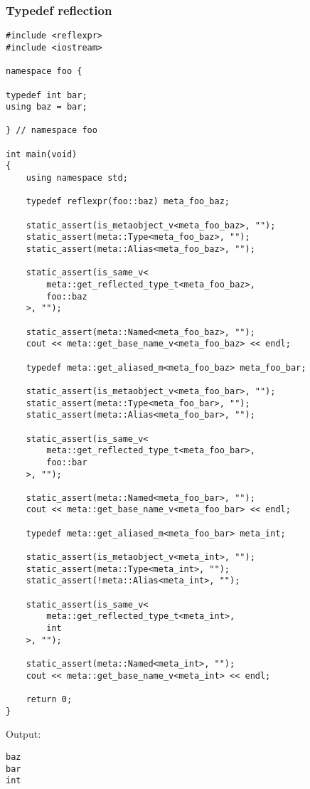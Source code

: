 \subsubsection{Typedef reflection}

\begin{verbatim}
#include <reflexpr>
#include <iostream>

namespace foo {

typedef int bar;
using baz = bar;

} // namespace foo

int main(void)
{
	using namespace std;

	typedef reflexpr(foo::baz) meta_foo_baz;

	static_assert(is_metaobject_v<meta_foo_baz>, "");
	static_assert(meta::Type<meta_foo_baz>, "");
	static_assert(meta::Alias<meta_foo_baz>, "");

	static_assert(is_same_v<
		meta::get_reflected_type_t<meta_foo_baz>,
		foo::baz
	>, "");

	static_assert(meta::Named<meta_foo_baz>, "");
	cout << meta::get_base_name_v<meta_foo_baz> << endl;

	typedef meta::get_aliased_m<meta_foo_baz> meta_foo_bar;

	static_assert(is_metaobject_v<meta_foo_bar>, "");
	static_assert(meta::Type<meta_foo_bar>, "");
	static_assert(meta::Alias<meta_foo_bar>, "");

	static_assert(is_same_v<
		meta::get_reflected_type_t<meta_foo_bar>,
		foo::bar
	>, "");

	static_assert(meta::Named<meta_foo_bar>, "");
	cout << meta::get_base_name_v<meta_foo_bar> << endl;

	typedef meta::get_aliased_m<meta_foo_bar> meta_int;

	static_assert(is_metaobject_v<meta_int>, "");
	static_assert(meta::Type<meta_int>, "");
	static_assert(!meta::Alias<meta_int>, "");

	static_assert(is_same_v<
		meta::get_reflected_type_t<meta_int>,
		int
	>, "");

	static_assert(meta::Named<meta_int>, "");
	cout << meta::get_base_name_v<meta_int> << endl;

	return 0;
}

\end{verbatim}

Output:

\begin{verbatim}
baz
bar
int
\end{verbatim}

